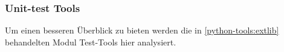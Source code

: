 \subsubsection{Unit-test Tools}\label{python-tools:extlib:unit}

Um einen besseren Überblick zu bieten werden die in \ref{python-tools:extlib}
behandelten Modul Test-Tools hier analysiert.



